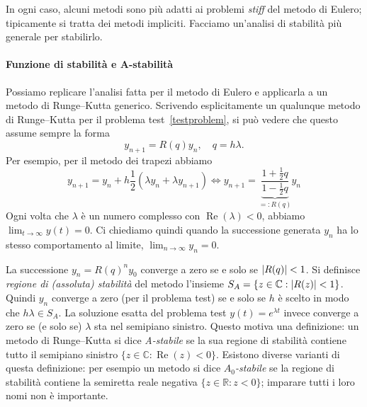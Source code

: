 \documentclass[a4paper]{report}
\DeclarePairedDelimiter{\abs}{\lvert}{\rvert}
\theoremstyle{definiton}
\theoremstyle{remark}
\begin{document}
In ogni caso, alcuni metodi sono più adatti ai problemi \emph{stiff} del metodo di Eulero; tipicamente si tratta dei metodi impliciti. Facciamo un'analisi di stabilità più generale per stabilirlo.

\paragraph{Funzione di stabilità e A-stabilità}

Possiamo replicare l'analisi fatta per il metodo di Eulero e applicarla a un metodo di Runge--Kutta generico. Scrivendo esplicitamente un qualunque metodo di Runge--Kutta per il problema test~\eqref{testproblem}, si può vedere che questo assume sempre la forma
\[
y_{n+1} = R(q)y_n, \quad q = h\lambda.
\]
Per esempio, per il metodo dei trapezi abbiamo
\[
y_{n+1} = y_n + h \frac12(\lambda y_n + \lambda y_{n+1}) \iff y_{n+1} = \underbrace{\frac{1+\frac12 q}{1-\frac12q}}_{=:R(q)}y_n
\]
Ogni volta che $\lambda$ è un numero complesso con $\operatorname{Re}(\lambda) < 0$, abbiamo $\lim_{t\to\infty} y(t) = 0$. Ci chiediamo quindi quando la successione generata $y_n$ ha lo stesso comportamento al limite, $\lim_{n\to\infty} y_n = 0$.

La successione $y_n = R(q)^n y_0$ converge a zero se e solo se $\abs{R(q)} < 1$. Si definisce \emph{regione di (assoluta) stabilità} del metodo l'insieme $S_A = \{z \in \mathbb{C} : \abs{R(z)}<1\}$. Quindi $y_n$ converge a zero (per il problema test) se e solo se $h$ è scelto in modo che $h\lambda \in S_A$. La soluzione esatta del problema test $y(t) = e^{\lambda t}$ invece converge a zero se (e solo se) $\lambda$ sta nel semipiano sinistro. Questo motiva una definizione: un metodo di Runge--Kutta si dice \emph{A-stabile} se la sua regione di stabilità contiene tutto il semipiano sinistro $\{z\in \mathbb{C} : \operatorname{Re}(z) < 0\}$. Esistono diverse varianti di questa definizione: per esempio un metodo si dice \emph{$A_0$-stabile} se la regione di stabilità contiene la semiretta reale negativa $\{z\in\mathbb{R}: z<0\}$; imparare tutti i loro nomi non è importante.
\end{document}
